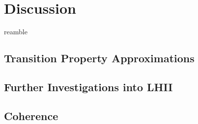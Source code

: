 %
%
\let\textcircled=\pgftextcircled
\chapter{Discussion}
\label{chap:discussion}

reamble

\section{Transition Property Approximations}
\label{sec:transition_properties}


\section{Further Investigations into LHII}
\label{sec:further_LHII}


\section{Coherence}
\label{sec:coherence}


